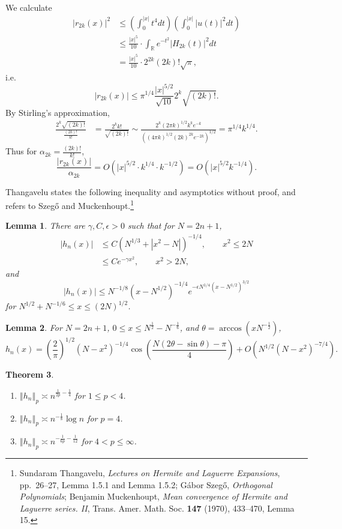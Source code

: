 \documentclass{article}
\newcommand{\norm}[1]{\left\Vert #1 \right\Vert}
\newtheorem{theorem}{Theorem}
\newtheorem{lemma}[theorem]{Lemma}
\theoremstyle{definition}
\begin{document}
We calculate
\begin{align*}
|r_{2k}(x)|^2&\leq \left(\int_0^{|x|} t^4 dt \right) \left( \int_0^{|x|} |u(t)|^2 dt \right)\\
&\leq \frac{|x|^5}{10} \cdot \int_{\mathbb{R}} e^{-t^2}  |H_{2k}(t)|^2 dt\\
&=  \frac{|x|^5}{10} \cdot 2^{2k} (2k)! \sqrt{\pi},
\end{align*}
i.e.
\[
|r_{2k}(x)| \leq \pi^{1/4} \frac{|x|^{5/2}}{\sqrt{10}} 2^k \sqrt{(2k)!}.
\]
By Stirling's approximation,
\begin{align*}
\frac{2^k \sqrt{(2k)!}}{\frac{(2k)!}{k!}}&=  \frac{2^k k!}{\sqrt{(2k)!}}
\sim \frac{2^k (2\pi k)^{1/2} k^k e^{-k}}{((4\pi k)^{1/2} (2k)^{2k} e^{-2k})^{1/2}}
=\pi^{1/4} k^{1/4}.
\end{align*}
Thus for $\alpha_{2k} = \frac{(2k)!}{k!}$, 
\[
\frac{|r_{2k}(x)|}{\alpha_{2k}}  = O(|x|^{5/2} \cdot k^{1/4} \cdot k^{-1/2})
=O(|x|^{5/2} k^{-1/4}). 
\]

Thangavelu states the following inequality and asymptotics without proof, and refers to
Szeg\H{o} and Muckenhoupt.\footnote{Sundaram Thangavelu, {\em Lectures on Hermite and Laguerre Expansions},
pp.~26--27, Lemma 1.5.1 and Lemma 1.5.2;
G\'abor Szeg\H{o}, {\em Orthogonal Polynomials};
Benjamin Muckenhoupt, {\em Mean convergence of Hermite and Laguerre series. II},
Trans. Amer. Math. Soc. \textbf{147} (1970), 433--470, Lemma 15.}

\begin{lemma}
There are $\gamma,C,\epsilon>0$ such that
for $N=2n+1$,
\begin{align*}
|h_n(x)|&\leq C(N^{1/3} + |x^2-N|)^{-1/4},\qquad x^2 \leq 2N\\
&\leq Ce^{-\gamma x^2},\qquad x^2>2N,
\end{align*}
and
\[
|h_n(x)| \leq N^{-1/8} (x-N^{1/2})^{-1/4} e^{-\epsilon N^{1/4}(x-N^{1/2})^{3/2}}
\]
for $N^{1/2}+N^{-1/6} \leq x \leq (2N)^{1/2}$. 
\end{lemma}


\begin{lemma}
For $N=2n+1$,
$0 \leq x \leq N^{\frac{1}{2}}-N^{-\frac{1}{6}}$, and $\theta=\arccos(xN^{-\frac{1}{2}})$,
\[
h_n(x) = \left(\frac{2}{\pi}\right)^{1/2} (N-x^2)^{-1/4} \cos \left( \frac{N(2\theta-\sin\theta)-\pi}{4}\right)
+O(N^{1/2}(N-x^2)^{-7/4}).
\]
\end{lemma}

\begin{theorem}
\begin{enumerate}
\item $\norm{h_n}_p \asymp n^{\frac{1}{2p}-\frac{1}{4}}$ for $1 \leq p < 4$.
\item $\norm{h_n}_p \asymp n^{-\frac{1}{8}} \log n$ for $p=4$.
\item $\norm{h_n}_p \asymp n^{-\frac{1}{6p}-\frac{1}{12}}$ for $4<p \leq \infty$. 
\end{enumerate}
\end{theorem}
\end{document}
